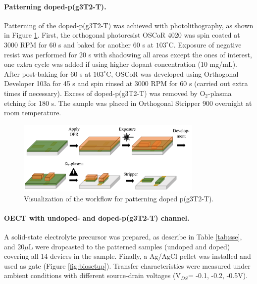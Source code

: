 \paragraph{Patterning doped-p(g3T2-T).}Patterning of the doped-p(g3T2-T) was achieved with photolithography, as shown in Figure \ref{fig:dopedpat}. First, the orthogonal photoresist OSCoR 4020 was spin coated at 3000 RPM for 60 s and baked for another 60 s at $103^{\circ}$C. Exposure of negative resist was performed for 20 s with shadowing all areas except the ones of interest, one extra cycle was added if using higher dopant concentration (10 mg/mL). After post-baking for 60 s at $103^{\circ}$C, OSCoR was developed using Orthogonal Developer 103a for 45 s and spin rinsed at 3000 RPM for 60 s (carried out extra times if necessary). Excess of doped-p(g3T2-T) was removed by O$_{2}$-plasma etching for 180 s. The sample was placed in Orthogonal Stripper 900 overnight at room temperature.

\begin{figure}[ht]
	\centering
	\includegraphics[width=9cm]{Images/pdf/doped-patterning.pdf}
	\caption{Visualization of the workflow for patterning doped p(g3T2-T).}
	\label{fig:dopedpat}
\end{figure}

\paragraph{OECT with undoped- and doped-p(g3T2-T) channel.} A solid-state electrolyte precursor was prepared, as describe in Table \ref{tab:sse}, and 20$\mu$L were dropcasted to the patterned samples (undoped and doped) covering all 14 devices in the sample. Finally, a Ag/AgCl pellet was installed and used as gate (Figure \ref{fig:biosetup}). Transfer characteristics were measured under ambient conditions with different source-drain voltages (V$_{DS}$= -0.1, -0.2, -0.5V).

